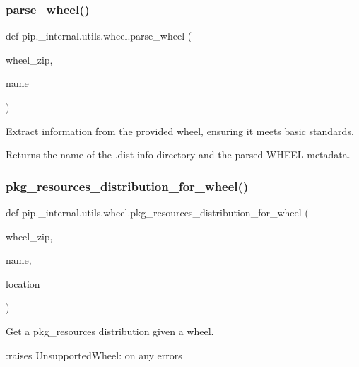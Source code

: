 \subsubsection{\texorpdfstring{parse\+\_\+wheel()}{parse\_wheel()}}
{\footnotesize\ttfamily def pip.\+\_\+internal.\+utils.\+wheel.\+parse\+\_\+wheel (\begin{DoxyParamCaption}\item[{}]{wheel\+\_\+zip,  }\item[{}]{name }\end{DoxyParamCaption})}

\begin{DoxyVerb}Extract information from the provided wheel, ensuring it meets basic
standards.

Returns the name of the .dist-info directory and the parsed WHEEL metadata.
\end{DoxyVerb}
 \mbox{\label{namespacepip_1_1__internal_1_1utils_1_1wheel_af34bfda22bc345e6ba61a4f98354ae46}} 
\subsubsection{\texorpdfstring{pkg\+\_\+resources\+\_\+distribution\+\_\+for\+\_\+wheel()}{pkg\_resources\_distribution\_for\_wheel()}}
{\footnotesize\ttfamily def pip.\+\_\+internal.\+utils.\+wheel.\+pkg\+\_\+resources\+\_\+distribution\+\_\+for\+\_\+wheel (\begin{DoxyParamCaption}\item[{}]{wheel\+\_\+zip,  }\item[{}]{name,  }\item[{}]{location }\end{DoxyParamCaption})}

\begin{DoxyVerb}Get a pkg_resources distribution given a wheel.

:raises UnsupportedWheel: on any errors
\end{DoxyVerb}
 \mbox{\label{namespacepip_1_1__internal_1_1utils_1_1wheel_ad8755183e1435a2e60d8877a3c29f0c5}} 
